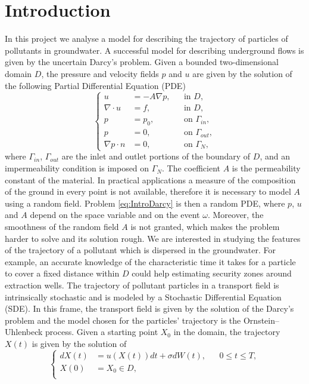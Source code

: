 \section{Introduction}

In this project we analyse a model for describing the trajectory of particles of pollutants in groundwater. A successful model for describing underground flows is given by the uncertain Darcy's problem. Given a bounded two-dimensional domain $D$, the pressure and velocity fields $p$ and $u$ are given by the solution of the following Partial Differential Equation (PDE)
\begin{equation}
	\label{eq:IntroDarcy}
	\left \{
  	\begin{aligned}
		u &= -A \nabla p, && \text{in } D, \\
		\nabla\cdot u &= f, && \text{in } D, \\
		p &= p_0, && \text{on } \Gamma_{in},\\
		p &= 0, && \text{on } \Gamma_{out}, \\
		\nabla p \cdot n &= 0, && \text{on } \Gamma_N,
	\end{aligned} \right.
\end{equation}
where $\Gamma_{in}$, $\Gamma_{out}$ are the inlet and outlet portions of the boundary of $D$, and an impermeability condition is imposed on $\Gamma_N$. The coefficient $A$ is the permeability constant of the material. In practical applications a measure of the composition of the ground in every point is not available, therefore it is necessary to model $A$ using a random field. Problem \eqref{eq:IntroDarcy} is then a random PDE, where $p$, $u$ and $A$ depend on the space variable and on the event $\omega$. Moreover, the smoothness of the random field $A$ is not granted, which makes the problem harder to solve and its solution rough. We are interested in studying the features of the trajectory of a pollutant which is dispersed in the groundwater. For example, an accurate knowledge of the characteristic time it takes for a particle to cover a fixed distance within $D$ could help estimating security zones around extraction wells. The trajectory of pollutant particles in a transport field is intrinsically stochastic and is modeled by a Stochastic Differential Equation (SDE). In this frame, the transport field is given by the solution of the Darcy's problem and the model chosen for the particles' trajectory is the Ornstein–Uhlenbeck process. Given a starting point $X_0$ in the domain, the trajectory $X(t)$ is given by the solution of
\begin{equation}
	\label{eq:IntroSDE}
	\left \{
	\begin{aligned}
		dX(t) &= u(X(t)) dt + \sigma dW(t), && 0 \leq t \leq T, \\
		X(0) &= X_0 \in D, \\
	\end{aligned} \right.
\end{equation}
